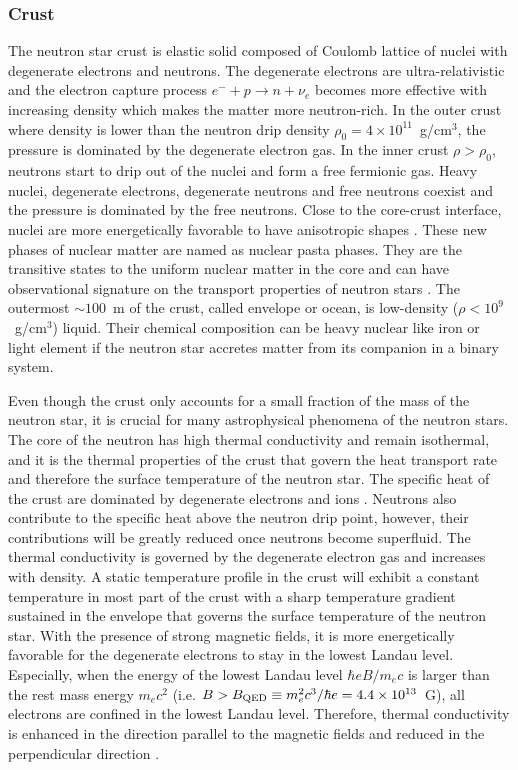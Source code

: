 \subsubsection{Crust}

The neutron star crust is elastic solid composed of Coulomb lattice of nuclei with degenerate electrons and neutrons.
The degenerate electrons are ultra-relativistic and the electron capture process $e^-+p\rightarrow n + \nu_e$ becomes more effective with increasing density which makes the matter more neutron-rich.
In the outer crust where density is lower than the neutron drip density $\rho_0=4\times 10^{11}$~g/cm$^3$, the pressure is dominated by the degenerate electron gas.
In the inner crust $\rho>\rho_0$,  neutrons start to drip out of the nuclei and form a free fermionic gas. Heavy nuclei, degenerate electrons, degenerate neutrons and free neutrons coexist and the pressure is dominated by the free neutrons.
Close to the core-crust interface, nuclei are more energetically favorable to have anisotropic shapes \citep{1983NuPhA.407..571R}. 
These new phases of nuclear matter are named as nuclear pasta phases. They are the transitive states to the uniform nuclear matter in the core and can have observational signature on the transport properties of neutron stars  \citep{2017RvMP...89d1002C}. 
The outermost $\sim 100$~m of the crust, called envelope or ocean, is low-density ($\rho<10^9$~g/cm$^3$) liquid.
Their chemical composition can be heavy nuclear like iron or light element if the neutron star accretes matter from its companion in a binary system.

Even though the crust only accounts for a small fraction of the mass of the neutron star, it is crucial for many astrophysical phenomena of the neutron stars.
The core of the neutron has high thermal conductivity and remain isothermal, and it is the thermal properties of the crust that govern the heat transport rate and therefore the surface temperature of the neutron star.
The specific heat of the crust are dominated by degenerate electrons and ions \citep{2015SSRv..191..239P}. Neutrons also contribute to the specific heat above the neutron drip point, however, their contributions will be greatly reduced once neutrons become superfluid.
The thermal conductivity is governed by the degenerate electron gas and increases with density. A static temperature profile in the crust will exhibit a constant temperature in most part of the crust with a sharp temperature gradient sustained in the envelope that governs the surface temperature of the neutron star.   
With the presence of strong magnetic fields, it is more energetically favorable for the degenerate electrons to stay in the lowest Landau level. 
Especially, when the energy of the lowest Landau level $\hbar e B/m_e c$ is larger than the rest mass energy $m_e c^2$ (i.e. $B>B_{\rm QED}\equiv m_e^2 c^3/\hbar e=4.4\times 10^{13}$~G), all electrons are confined in the lowest Landau level.
Therefore, thermal conductivity is enhanced in the direction parallel to the magnetic fields and reduced in the perpendicular direction \citep{1996A&A...306..999P,1996A&A...314..341P}.

